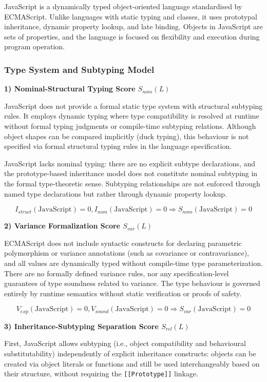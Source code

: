 JavaScript is a dynamically typed object-oriented language standardised by ECMAScript. Unlike languages with static typing and classes, it uses prototypal inheritance, dynamic property lookup, and late binding. Objects in JavaScript are sets of properties\cite{ecma262}, and the language is focused on flexibility and execution during program operation.

\subsubsection{Type System and Subtyping Model}

\textbf{1) Nominal-Structural Typing Score $S_{nom}(L)$}

JavaScript does not provide a formal static type system with structural subtyping rules. It employs dynamic typing where type compatibility is resolved at runtime without formal typing judgments or compile-time subtyping relations. Although object shapes can be compared implicitly (duck typing), this behaviour is not specified via formal structural typing rules in the language specification. 

JavaScript lacks nominal typing: there are no explicit subtype declarations, and the prototype-based inheritance model does not constitute nominal subtyping in the formal type-theoretic sense. Subtyping relationships are not enforced through named type declarations but rather through dynamic property lookup. 

\[
    I_{struct}(\text{JavaScript}) = 0, I_{nom}(\text{JavaScript}) = 0 \Rightarrow S_{nom}(\text{JavaScript}) = 0
\]

\textbf{2) Variance Formalization Score $S_{var}(L)$}

ECMAScript does not include syntactic constructs for declaring parametric polymorphism or variance annotations (such as covariance or contravariance), and all values are dynamically typed without compile-time type parameterization. 
There are no formally defined variance rules, nor any specification-level guarantees of type soundness related to variance. The type behaviour is governed entirely by runtime semantics without static verification or proofs of safety. 

\[
    V_{exp}(\text{JavaScript}) = 0, V_{sound}(\text{JavaScript}) = 0 \Rightarrow S_{var}(\text{JavaScript}) = 0
\]

\textbf{3) Inheritance-Subtyping Separation Score $S_{rel}(L)$}

First, JavaScript allows subtyping (i.e., object compatibility and behavioural substitutability) independently of explicit inheritance constructs: objects can be created via object literals or functions and still be used interchangeably based on their structure, without requiring the \texttt{[[Prototype]]} linkage.

